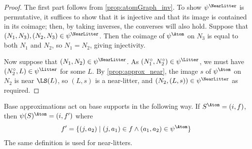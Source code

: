 \begin{proof}
  \leanok
  The first part follows from \cref{prop:atomGraph_inv}.
  To show \( \psi^\NearLitter \) is permutative, it suffices to show that it is injective and that its image is contained in its coimage; then, by taking inverses, the converses will also hold.
  Suppose that \( (N_1, N_3), (N_2, N_3) \in \psi^\NearLitter \).
  Then the coimage of \( \psi^\Atom \) on \( N_3 \) is equal to both \( N_1 \) and \( N_2 \), so \( N_1 = N_2 \), giving injectivity.

  Now suppose that \( (N_1, N_2) \in \psi^\NearLitter \).
  As \( (N_1^\circ, N_2^\circ) \in \psi^\Litter \), we must have \( (N_2^\circ, L) \in \psi^\Litter \) for some \( L \).
  By \cref{prop:approx_near}, the image \( s \) of \( \psi^\Atom \) on \( N_2 \) is near \( \LS(L) \), so \( (L, s) \) is a near-litter, and \( (N_2, (L, s)) \in \psi^\NearLitter \) as required.
\end{proof}
\begin{definition}
  \label{def:smulApproxSupport}
  Base approximations act on base supports in the following way.
  If \( S^\Atom = (i, f) \), then \( \psi(S)^\Atom = (i, f') \) where
  \[ f' = \{ (j, a_2) \mid (j, a_1) \in f \wedge (a_1, a_2) \in \psi^\Atom \} \]
  The same definition is used for near-litters.
\end{definition}

